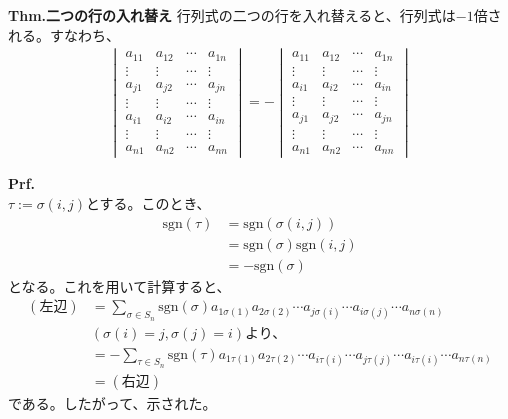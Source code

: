 \documentclass[a4paper,11pt]{jsarticle}
\numberwithin{equation}{section}
\begin{document}
\begin{itembox}[l]{\textbf{Thm.二つの行の入れ替え}}
  行列式の二つの行を入れ替えると、行列式は$-1$倍される。すなわち、
  \begin{align}
  \begin{vmatrix}
    a_{11} & a_{12} & \cdots & a_{1n}\\
    \vdots & \vdots & \cdots & \vdots\\
    a_{j1} & a_{j2} & \cdots & a_{jn}\\
    \vdots & \vdots & \cdots & \vdots\\
    a_{i1} & a_{i2} & \cdots & a_{in}\\
    \vdots & \vdots & \cdots & \vdots\\
    a_{n1} & a_{n2} & \cdots & a_{nn}
  \end{vmatrix}
  =-
  \begin{vmatrix}
    a_{11} & a_{12} & \cdots & a_{1n}\\
    \vdots & \vdots & \cdots & \vdots\\
    a_{i1} & a_{i2} & \cdots & a_{in}\\
    \vdots & \vdots & \cdots & \vdots\\
    a_{j1} & a_{j2} & \cdots & a_{jn}\\
    \vdots & \vdots & \cdots & \vdots\\
    a_{n1} & a_{n2} & \cdots & a_{nn}
  \end{vmatrix}
  \end{align}
\end{itembox}
\textbf{Prf.}\\
$\tau := \sigma (i,j)$とする。このとき、
\begin{align}
  \text{sgn}(\tau) &= \text{sgn}(\sigma(i,j))\\
  &= \text{sgn}(\sigma) \text{sgn}(i,j)\\
  &= -\text{sgn}(\sigma)
\end{align}
となる。これを用いて計算すると、
\begin{align}
  (\text{左辺}) &= \sum_{\sigma \in S_n} \text{sgn}(\sigma) a_{1\sigma(1)}a_{2\sigma(2)}\cdots a_{j\sigma(i)}\cdots a_{i\sigma(j)}\cdots a_{n\sigma(n)}\\
  & (\sigma(i) = j, \sigma(j) = i)\text{より、}\\
  &=- \sum_{\tau \in S_n} \text{sgn}(\tau) a_{1\tau(1)}a_{2\tau(2)}\cdots a_{i\tau(i)}\cdots a_{j\tau(j)}\cdots a_{i\tau(i)}\cdots a_{n\tau(n)}\\
  &=( \text{右辺})
\end{align}
である。したがって、示された。\hfill\qedsymbol\\
\end{document}
